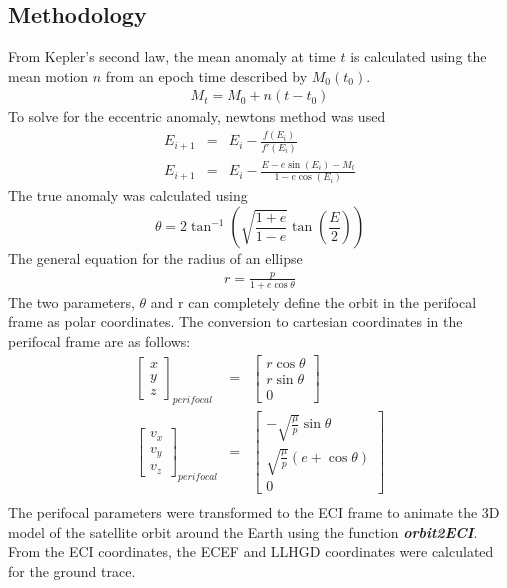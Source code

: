\documentclass[Space3_Assign1.tex]{subfiles}
\begin{document}
\subsection{Methodology}
From Kepler's second law, the mean anomaly at time $\textit{t}$ is calculated using the mean motion $\textit{n}$ from an epoch time described by $M_0(t_0)$. 
\begin{eqnarray}
M_t = M_0 + n(t-t_0)
\end{eqnarray}
To solve for the eccentric anomaly, newtons method was used
\begin{eqnarray}
E_{i+1} &=& E_i - \frac{f(E_i)}{f'(E_i)}\\
E_{i+1} &=& E_i - \frac{E-e\sin(E_i)-M_t}{1-e\cos(E_i)}
\end{eqnarray}
The true anomaly was calculated using
\begin{equation}
\theta = 2\tan^{-1}\left(\sqrt{\frac{1+e}{1-e}}\tan\left(\frac{E}{2}\right)\right)
\end{equation} 
The general equation for the radius of an ellipse
\begin{eqnarray}
r = \frac{p}{1+e\cos\theta}
\end{eqnarray}
The two parameters, $\theta$ and r can completely define the orbit in the perifocal frame as polar coordinates. The conversion to cartesian coordinates in the perifocal frame are as follows:
\begin{eqnarray}
\left[ \begin{array}{c}
x\\y\\z
\end{array} \right]_{perifocal} &=& \left[ \begin{array}{c}
r\cos\theta \\ r\sin \theta \\ 0
\end{array} \right] \\
\left[ \begin{array}{c}
v_x\\v_y\\v_z
\end{array} \right]_{perifocal} &=& \left[ \begin{array}{c}
-\sqrt{\frac{\mu}{p}}\sin\theta \\\sqrt{\frac{\mu}{p}}(e+\cos\theta) \\ 0
\end{array} \right] \\
\end{eqnarray}
The perifocal parameters were transformed to the ECI frame to animate the 3D model of the satellite orbit around the Earth using the function \textit{\textbf{orbit2ECI}}. From the ECI coordinates, the ECEF and LLHGD coordinates were calculated for the ground trace.
\end{document}
